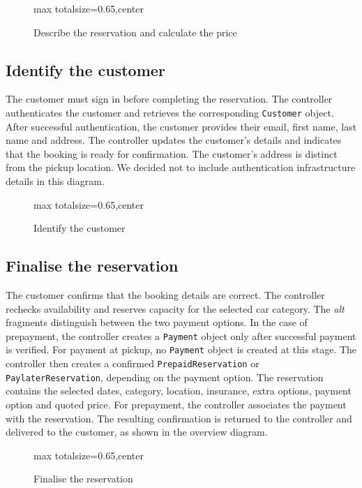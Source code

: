 \documentclass[12pt,a4paper]{report}
\begin{document}
\begin{figure}[H]
    \centering
    \begin{adjustbox}{max totalsize={\linewidth}{0.65\textheight},center}
    \end{adjustbox}
    \caption{Describe the reservation and calculate the price}
    \label{fig:reservation-selection}
\end{figure}

\clearpage
\subsection{Identify the customer}
The customer must sign in before completing the reservation. The controller authenticates the customer
and retrieves the corresponding \texttt{Customer} object.
After successful authentication, the customer provides their email, first name, last name and address.
The controller updates the customer's details and indicates that the booking is ready for confirmation.
The customer's address is distinct from the pickup location.
We decided not to include authentication infrastructure details in this diagram.

\begin{figure}[H]
    \centering
    \begin{adjustbox}{max totalsize={\linewidth}{0.65\textheight},center}
    \end{adjustbox}
    \caption{Identify the customer}
    \label{fig:reservation-customer}
\end{figure}

\clearpage
\subsection{Finalise the reservation}
The customer confirms that the booking details are correct. The controller rechecks availability and reserves capacity for the selected car category.
The \emph{alt} fragments distinguish between the two payment options.
In the case of prepayment, the controller creates a \texttt{Payment} object only after successful payment is verified.
For payment at pickup, no \texttt{Payment} object is created at this stage. The controller then creates a confirmed
\texttt{PrepaidReservation} or \texttt{PaylaterReservation}, depending on the payment option. The reservation contains the selected dates, category, location, insurance, extra options, payment option and quoted price.
For prepayment, the controller associates the payment with the reservation.
The resulting confirmation is returned to the controller and delivered to the customer, as shown in the overview diagram.
\begin{figure}[H]
    \centering
    \begin{adjustbox}{max totalsize={\linewidth}{0.65\textheight},center}
    \end{adjustbox}
    \caption{Finalise the reservation}
    \label{fig:reservation-finalize}
\end{figure}
\end{document}
